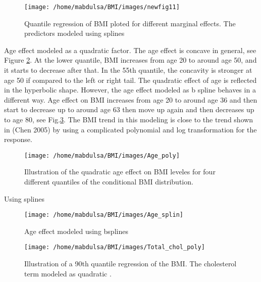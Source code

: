 \documentclass[
  12pt,
]{article}
\begin{document}
\begin{figure}

{\centering \texttt{[image: /home/mabdulsa/BMI/images/newfig11]} 

}

\caption{Quantile regression of BMI ploted  for different marginal effects. The predictors modeled using splines }\label{fig:resu12}
\end{figure}

Age effect modeled as a quadratic factor. The age effect is concave in general, see Figure \ref{fig:resu3}. At the lower quantile, BMI increases from age 20 to around age 50, and it starts to decrease after that. In the 55th quantile, the concavity is stronger at age 50 if compared to the left or right tail. The quadratic effect of age is reflected in the hyperbolic shape. However, the age effect modeled as b spline behaves in a different way. Age effect on BMI increases from age 20 to around age 36 and then start to decrease up to around age 63 then move up again and then decreases up to age 80, see Fig.\ref{fig:resu33}. The BMI trend in this modeling is close to the trend shown in (Chen 2005) by using a complicated polynomial and log transformation for the response.

\begin{figure}

{\centering \texttt{[image: /home/mabdulsa/BMI/images/Age\_poly]} 

}

\caption{Illustration of the quadratic age effect on BMI leveles for four different quantiles of the conditional BMI distribution. }\label{fig:resu3}
\end{figure}

Using splines

\begin{figure}

{\centering \texttt{[image: /home/mabdulsa/BMI/images/Age\_splin]} 

}

\caption{Age effect modeled using bsplines }\label{fig:resu33}
\end{figure}

\begin{figure}

{\centering \texttt{[image: /home/mabdulsa/BMI/images/Total\_chol\_poly]} 

}

\caption{Illustration of a 90th quantile regression of the BMI. The cholesterol term modeled as  quadratic .}\label{fig:resu4}
\end{figure}
\end{document}
